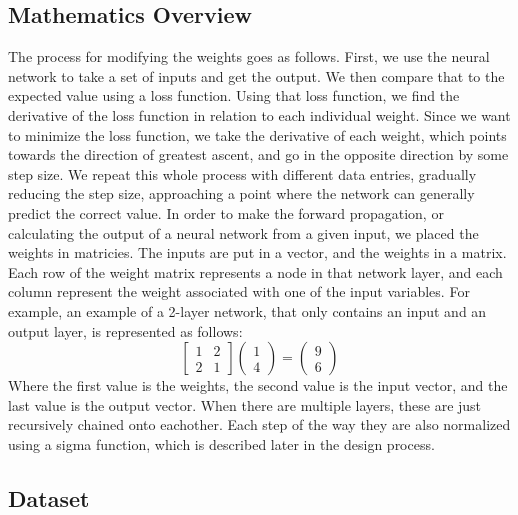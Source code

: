 \documentclass[10pt]{article}
\begin{document}
\subsection{Mathematics Overview}
The process for modifying the weights goes as follows. First, we use the neural network to take a set of inputs and get the output. We then compare that to the expected value using a loss function. Using that loss function, we find the derivative of the loss function in relation to each individual weight. Since we want to minimize the loss function, we take the derivative of each weight, which points towards the direction of greatest ascent, and go in the opposite direction by some step size. We repeat this whole process with different data entries, gradually reducing the step size, approaching a point where the network can generally predict the correct value.\newline
In order to make the forward propagation, or calculating the output of a neural network from a given input, we placed the weights in matricies. The inputs are put in a vector, and the weights in a matrix. Each row of the weight matrix represents a node in that network layer, and each column represent the weight associated with one of the input variables.
For example, an example of a 2-layer network, that only contains an input and an output layer, is represented as follows:
$$\begin{bmatrix} 1 & 2 \\ 2 & 1\end{bmatrix}\begin{pmatrix}1\\4\end{pmatrix} = \begin{pmatrix}9 \\ 6\end{pmatrix}$$
Where the first value is the weights, the second value is the input vector, and the last value is the output vector. When there are multiple layers, these are just recursively chained onto eachother. Each step of the way they are also normalized using a sigma function, which is described later in the design process.
\subsection{Dataset}
\end{document}

